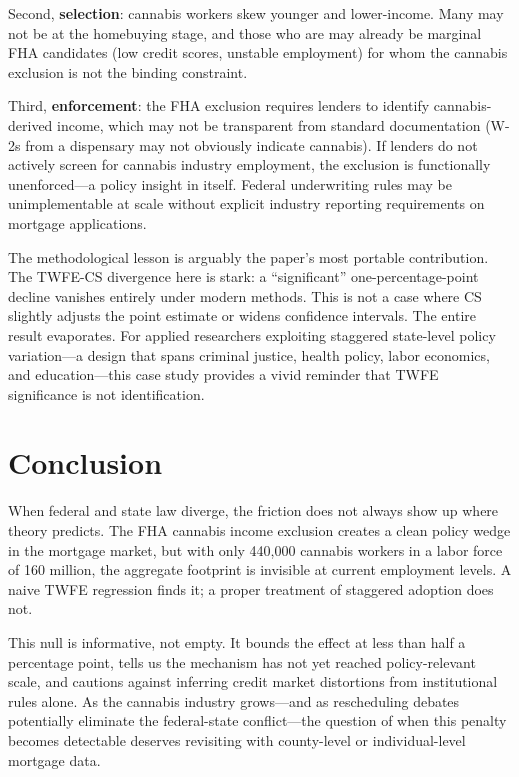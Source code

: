 \documentclass[12pt]{article}
\begin{document}
Second, \textbf{selection}: cannabis workers skew younger and lower-income. Many may not be at the homebuying stage, and those who are may already be marginal FHA candidates (low credit scores, unstable employment) for whom the cannabis exclusion is not the binding constraint.

Third, \textbf{enforcement}: the FHA exclusion requires lenders to identify cannabis-derived income, which may not be transparent from standard documentation (W-2s from a dispensary may not obviously indicate cannabis). If lenders do not actively screen for cannabis industry employment, the exclusion is functionally unenforced---a policy insight in itself. Federal underwriting rules may be unimplementable at scale without explicit industry reporting requirements on mortgage applications.

The methodological lesson is arguably the paper's most portable contribution. The TWFE-CS divergence here is stark: a ``significant'' one-percentage-point decline vanishes entirely under modern methods. This is not a case where CS slightly adjusts the point estimate or widens confidence intervals. The entire result evaporates. For applied researchers exploiting staggered state-level policy variation---a design that spans criminal justice, health policy, labor economics, and education---this case study provides a vivid reminder that TWFE significance is not identification.

\section{Conclusion}
\label{sec:conclusion}

When federal and state law diverge, the friction does not always show up where theory predicts. The FHA cannabis income exclusion creates a clean policy wedge in the mortgage market, but with only 440,000 cannabis workers in a labor force of 160 million, the aggregate footprint is invisible at current employment levels. A naive TWFE regression finds it; a proper treatment of staggered adoption does not.

This null is informative, not empty. It bounds the effect at less than half a percentage point, tells us the mechanism has not yet reached policy-relevant scale, and cautions against inferring credit market distortions from institutional rules alone. As the cannabis industry grows---and as rescheduling debates potentially eliminate the federal-state conflict---the question of when this penalty becomes detectable deserves revisiting with county-level or individual-level mortgage data.
\end{document}
